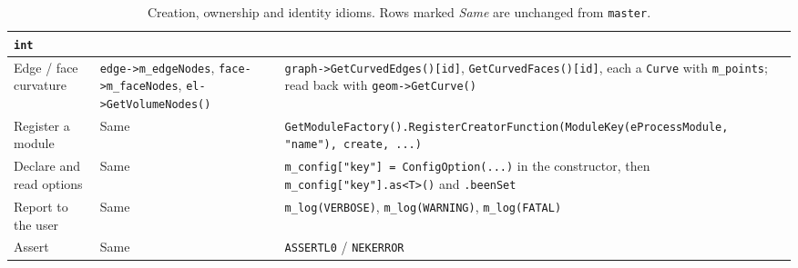 \begin{table}[h!]
\begin{tabular}{p{}p{}p{}}
    \texttt{int}\\
    \hline
    Edge / face curvature &
    \texttt{edge->m\_edgeNodes}, \texttt{face->m\_faceNodes},
    \texttt{el->GetVolumeNodes()} &
    \texttt{graph->GetCurvedEdges()[id]},
    \texttt{GetCurvedFaces()[id]}, each a \texttt{Curve} with
    \texttt{m\_points}; read back with \texttt{geom->GetCurve()}\\
    \hline
    Register a module &
    Same &
    \texttt{GetModuleFactory().RegisterCreatorFunction(ModuleKey(eProcessModule,
      "name"), create, ...)}\\
    \hline
    Declare and read options &
    Same &
    \texttt{m\_config["key"] = ConfigOption(...)} in the constructor,
    then \texttt{m\_config["key"].as<T>()} and \texttt{.beenSet}\\
    \hline
    Report to the user &
    Same &
    \texttt{m\_log(VERBOSE)}, \texttt{m\_log(WARNING)},
    \texttt{m\_log(FATAL)}\\
    \hline
    Assert &
    Same &
    \texttt{ASSERTL0} / \texttt{NEKERROR}\\
    \hline
  \end{tabular}
  \caption{Creation, ownership and identity idioms. Rows marked
    \textit{Same} are unchanged from \texttt{master}.}
  \label{tab:ops_ownership}
\end{table}

